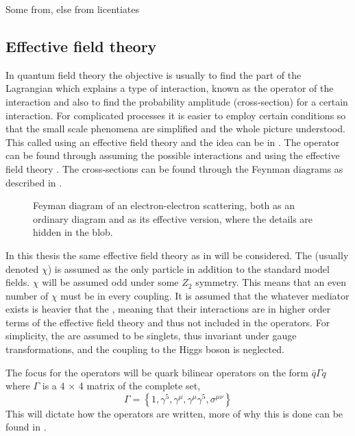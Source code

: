 Some from, else from licentiates \citep{Martin:1998,Dine:1981,Pavel:2014}

\subsection{Effective field theory}
In quantum field theory the objective is usually to find the part of the Lagrangian which explains a type of interaction, known as the operator of the interaction and also to find the probability amplitude (cross-section) for a certain interaction. For complicated processes it is easier to employ certain conditions so that the small scale phenomena are simplified and the whole picture understood. This called using an effective field theory and the idea can be in . The operator can be found through assuming the possible interactions and using the effective field theory \citep{Zee:2003}. The cross-sections can be found through the Feynman diagrams as described in . 
 \begin{figure}[!ht]
    \hfill
    \caption{Feyman diagram of an electron-electron scattering, both as an ordinary diagram and as its effective version, where the details are hidden in the blob.}
    \label{fig:feymanc}
  \end{figure}

In this thesis the same effective field theory as in \citep{82.116010,Goodman:2010} will be considered. The \abbrWIMP (usually denoted $\chi$) is assumed as the only particle in addition to the standard model fields. $\chi$ will be assumed odd under some $Z_2$ symmetry. This means that an even number of $\chi$ must be in every coupling. It is assumed that the whatever mediator exists is heavier that the \abbrWIMPS, meaning that their interactions are in higher order terms of the effective field theory and thus not included in the operators. For simplicity, the \abbrWIMPS are assumed to be \abbrSM singlets, thus invariant under \abbrSM gauge transformations, and the coupling to the Higgs boson is neglected.

The focus for the operators will be quark bilinear operators on the form $\bar{q}\Gamma q$ where $\Gamma$ is a 4 $\times$ 4 matrix of the complete set, 
\begin{equation}
\Gamma = \left\lbrace 1,\gamma ^5,\gamma ^\mu,\gamma ^\mu \gamma ^5, \sigma ^{\mu \nu} \right\rbrace
\end{equation}
This will dictate how the operators are written, more of why this is done can be found in \citep{82.116010,Goodman:2010,Zee:2003}.

